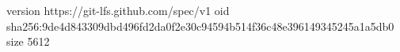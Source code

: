 version https://git-lfs.github.com/spec/v1
oid sha256:9de4d843309dbd496fd2da0f2e30c94594b514f36c48e396149345245a1a5db0
size 5612
